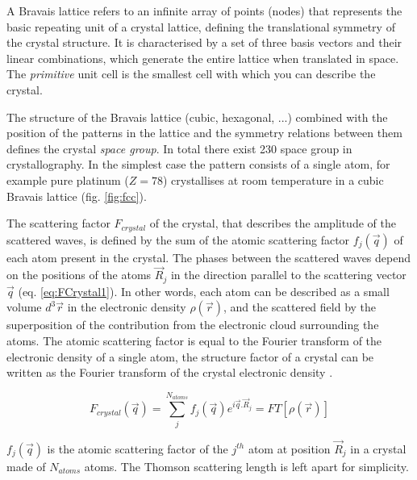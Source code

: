 A Bravais lattice refers to an infinite array of points (nodes) that represents the basic repeating unit of a crystal lattice, defining the translational symmetry of the crystal structure.
It is characterised by a set of three basis vectors and their linear combinations, which generate the entire lattice when translated in space.
The \textit{primitive} unit cell is the smallest cell with which you can describe the crystal.

The structure of the Bravais lattice (cubic, hexagonal, ...) combined with the position of the patterns in the lattice and the symmetry relations between them defines the crystal \textit{space group}.
In total there exist 230 space group in crystallography.
In the simplest case the pattern consists of a single atom, for example pure platinum ($Z=78$) crystallises at room temperature in a cubic Bravais lattice (fig. \ref{fig:fcc}).

The scattering factor $F_{crystal}$ of the crystal, that describes the amplitude of the scattered waves, is defined by the sum of the atomic scattering factor $f_j(\vec{q})$ of each atom present in the crystal.
The phases between the scattered waves depend on the positions of the atoms $\vec{R}_j$ in the direction parallel to the scattering vector $\vec{q}$ (eq. \ref{eq:FCrystal1}).
In other words, each atom can be described as a small volume $d^3\vec{r}$ in the electronic density $\rho(\vec{r})$, and the scattered field by the superposition of the contribution from the electronic cloud surrounding the atoms.
The atomic scattering factor is equal to the Fourier transform of the electronic density of a single atom, the structure factor of a crystal can be written as the Fourier transform of the crystal electronic density \parencite{Paganin}.

\begin{equation}
    \label{eq:FCrystal1}
    F_{crystal}(\vec{q}) = \sum_j^{N_{atoms}} f_j(\vec{q}) e^{i\vec{q}.\vec{R}_j} = FT[\rho(\vec{r})]
\end{equation}

$f_j(\vec{q})$ is the atomic scattering factor of the $j^{th}$ atom at position $\vec{R}_j$ in a crystal made of $N_{atoms}$ atoms.
The Thomson scattering length is left apart for simplicity.

